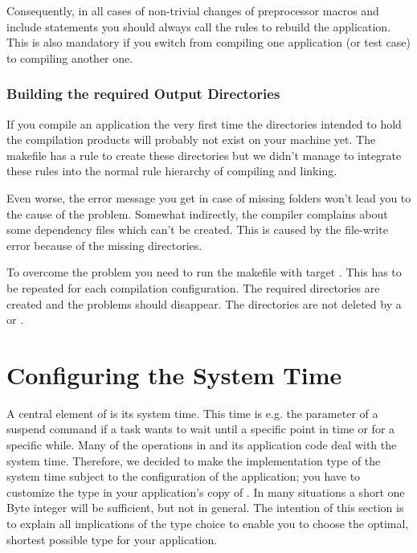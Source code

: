 Consequently, in all cases of non-trivial changes of preprocessor macros
and include statements you should always call the rules to rebuild the
application. This is also mandatory if you switch from compiling one
\rtos{} application (or test case) to compiling another one.


\subsubsection{Building the required Output Directories}

If you compile an \rtos{} application the very first time the directories
intended to hold the compilation products will probably not exist on your
machine yet. The makefile has a rule to create these directories but we
didn't manage to integrate these rules into the normal rule hierarchy of
compiling and linking.

Even worse, the error message you get in case of missing folders won't
lead you to the cause of the problem. Somewhat indirectly, the compiler
complains about some dependency files which can't be created. This is
caused by the file-write error because of the missing directories.

To overcome the problem you need to run the makefile with target
. This has to be repeated for each compilation
configuration. The required directories are created and the problems
should disappear. The directories are not deleted by a  or
.


\section{Configuring the System Time}
\label{secSystemTime}

A central element of \rtos{} is its system time. This time is e.g. the
parameter of a suspend command if a task wants to wait until a specific
point in time or for a specific while. Many of the
operations in \rtos{} and its application code deal with the system time.
Therefore, we decided to make the implementation type of the system time
subject to the configuration of the application; you have to customize the
type in your application's copy of . In many
situations a short one Byte integer will be sufficient, but not in
general. The intention of this section is to explain all implications of
the type choice to enable you to choose the optimal, shortest possible
type for your application.


